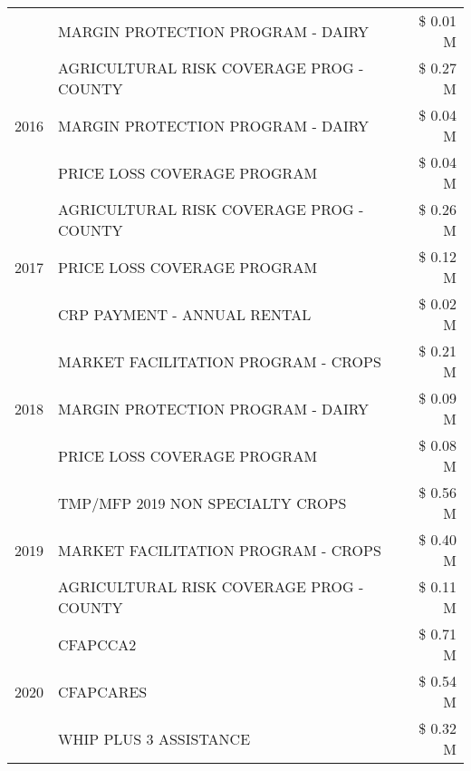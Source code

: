 \begin{tabular}{llr}
 & MARGIN PROTECTION PROGRAM - DAIRY & \$ 0.01 M \\
\cline{1-3}
\multirow[t]{3}{*}{2016} & AGRICULTURAL RISK COVERAGE PROG - COUNTY & \$ 0.27 M \\
 & MARGIN PROTECTION PROGRAM - DAIRY & \$ 0.04 M \\
 & PRICE LOSS COVERAGE PROGRAM & \$ 0.04 M \\
\cline{1-3}
\multirow[t]{3}{*}{2017} & AGRICULTURAL RISK COVERAGE PROG - COUNTY & \$ 0.26 M \\
 & PRICE LOSS COVERAGE PROGRAM & \$ 0.12 M \\
 & CRP PAYMENT - ANNUAL RENTAL & \$ 0.02 M \\
\cline{1-3}
\multirow[t]{3}{*}{2018} & MARKET FACILITATION PROGRAM - CROPS & \$ 0.21 M \\
 & MARGIN PROTECTION PROGRAM - DAIRY & \$ 0.09 M \\
 & PRICE LOSS COVERAGE PROGRAM & \$ 0.08 M \\
\cline{1-3}
\multirow[t]{3}{*}{2019} & TMP/MFP 2019 NON SPECIALTY CROPS & \$ 0.56 M \\
 & MARKET FACILITATION PROGRAM - CROPS & \$ 0.40 M \\
 & AGRICULTURAL RISK COVERAGE PROG - COUNTY & \$ 0.11 M \\
\cline{1-3}
\multirow[t]{3}{*}{2020} & CFAPCCA2 & \$ 0.71 M \\
 & CFAPCARES & \$ 0.54 M \\
 & WHIP PLUS 3 ASSISTANCE & \$ 0.32 M \\
\cline{1-3}
\bottomrule
\end{tabular}
